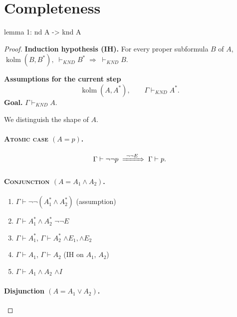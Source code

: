 \documentclass{article}
\begin{document}
\section{Completeness}
lemma 1: nd A -> knd A
\begin{proof}[Proof]
  \leavevmode\par
  \textbf{Induction hypothesis (IH).}\;
  For every proper subformula $B$ of $A$,
  \(
    \operatorname{kolm}(B,B^{*}),\;
    \vdash_{\textit{KND}} B^{*}
    \;\Rightarrow\;
    \vdash_{\textit{KND}} B .
  \)
  
  \medskip
  \textbf{Assumptions for the current step}
  \[
    \operatorname{kolm}(A,A^{*}),\qquad
    \Gamma\vdash_{\textit{KND}} A^{*}.
  \]
  \textbf{Goal.}\; $\Gamma\vdash_{\textit{KND}} A$.
  
  \bigskip
  \noindent
  We distinguish the shape of $A$.
  
  \paragraph{\textsc{Atomic case} \boldmath$(A=p)$.}
  \[
    \Gamma\vdash \neg\neg p
    \;\xRightarrow{\ \neg\neg E\ }\;
    \Gamma\vdash p.
  \]
  
  \paragraph{\textsc{Conjunction} \boldmath$(A=A_1\land A_2)$.}
  
  \begin{enumerate}[leftmargin=1.5em,labelsep=.5em,label={\textbf{Step~\arabic*:}}]
    \item $\Gamma\vdash \neg\neg(A_1^{*}\land A_2^{*})$
          \hfill(assumption)
    \item $\Gamma\vdash A_1^{*}\land A_2^{*}$
          \hfill$\neg\neg E$
    \item $\Gamma\vdash A_1^{*}$, \;$\Gamma\vdash A_2^{*}$
          \hfill$\land E_1,\land E_2$
    \item $\Gamma\vdash A_1$, \;$\Gamma\vdash A_2$
          \hfill(IH on $A_1$, $A_2$)
    \item $\Gamma\vdash A_1\land A_2$
          \hfill$\land I$
  \end{enumerate}
  
  \paragraph{Disjunction \boldmath$(A = A_{1}\lor A_{2})$.}


\end{proof}
\end{document}
